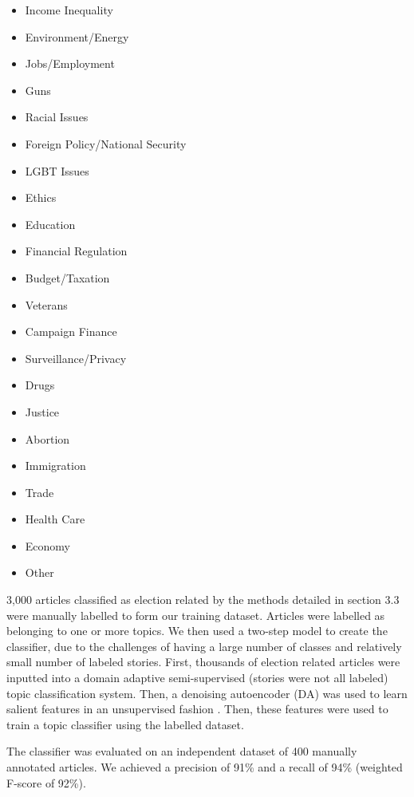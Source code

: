 \begin{multicols}{2}
    \begin{itemize}
    \itemsep-1em 
      \item Income Inequality
      \item Environment/Energy
      \item Jobs/Employment
      \item Guns
      \item Racial Issues
      \item Foreign Policy/National Security
      \item LGBT Issues
      \item Ethics
      \item Education
      \item Financial Regulation
      \item Budget/Taxation
      \item Veterans
      \item Campaign Finance
      \item Surveillance/Privacy
      \item Drugs
      \item Justice
      \item Abortion
      \item Immigration
      \item Trade
      \item Health Care
      \item Economy
      \item Other 
    \end{itemize}
\end{multicols}
 
 3,000 articles classified as election related by the methods detailed in section 3.3 were manually labelled to form our training dataset. Articles were labelled as belonging to one or more topics. We then used a two-step model to create the classifier, due to the challenges of having a large number of classes and relatively small number of labeled stories. First, thousands of election related articles were inputted into a domain adaptive semi-supervised (stories were not all labeled) topic classification system. Then, a denoising autoencoder (DA) was used to learn salient features in an unsupervised fashion \cite{vincent2008extracting}. Then, these features were used to train a topic classifier using the labelled dataset.

The classifier was evaluated on an independent dataset of 400 manually annotated articles. We achieved a precision of 91\% and a recall of 94\% (weighted F-score of 92\%).

